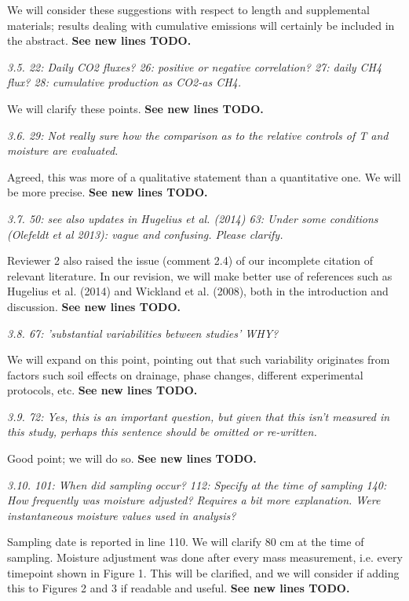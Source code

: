 \documentclass[11pt, oneside]{article}
\begin{document}
We will consider these suggestions with respect to length and supplemental materials; results dealing with cumulative emissions will certainly be included in the abstract. {\bf See new lines TODO.}

\medskip
{\it 3.5. 22: Daily CO2 fluxes?
26: positive or negative correlation?
27: daily CH4 flux?
28: cumulative production as CO2-as CH4. }

We will clarify these points. {\bf See new lines TODO.}

\medskip
{\it 3.6. 29: Not really sure how the comparison as to the relative controls of T and moisture are evaluated. }

Agreed, this was more of a qualitative statement than a quantitative one. We will be more precise. {\bf See new lines TODO.}

\medskip
{\it 3.7. 50: see also updates in Hugelius et al. (2014)
63: Under some conditions (Olefeldt et al 2013): vague and confusing. Please clarify. }

Reviewer 2 also raised the issue (comment 2.4) of our incomplete citation of relevant literature. In our revision, we will make better use of references such as Hugelius et al. (2014) and Wickland et al. (2008), both in the introduction and discussion. {\bf See new lines TODO.}

\medskip
{\it 3.8. 67: 'substantial variabilities between studies' WHY? }

We will expand on this point, pointing out that such variability originates from factors such soil effects on drainage, phase changes, different experimental protocols, etc. {\bf See new lines TODO.}

\medskip
{\it 3.9. 72: Yes, this is an important question, but given that this isn't measured in this study, perhaps this sentence should be omitted or re-written. }

Good point; we will do so. {\bf See new lines TODO.}

\medskip
{\it 3.10. 101: When did sampling occur?
112: Specify at the time of sampling
140: How frequently was moisture adjusted? Requires a bit more explanation. Were instantaneous moisture values used in analysis? }

Sampling date is reported in line 110. We will clarify 80 cm at the time of sampling. Moisture adjustment was done after every mass measurement, i.e. every timepoint shown in Figure 1. This will be clarified, and we will consider if adding this to Figures 2 and 3 if readable and useful. {\bf See new lines TODO.}
\end{document}

